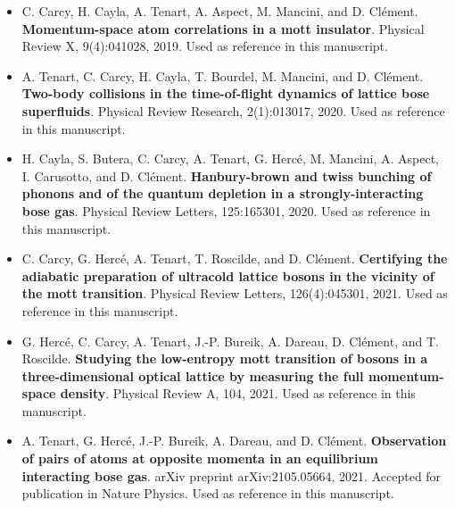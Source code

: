 \documentclass[a4paper, 11pt,twoside,openright]{book}
\begin{document}
\begin{itemize}
    \item C. Carcy, H. Cayla, A. Tenart, A. Aspect, M. Mancini, and D. Clément. \textbf{Momentum-space atom correlations in a mott insulator}. Physical Review X, 9(4):041028, 2019. Used as reference \cite{carcy2019momentum} in this manuscript.
    \vspace{0.5cm}
    \item A. Tenart, C. Carcy, H. Cayla, T. Bourdel, M. Mancini, and D. Clément. \textbf{Two-body collisions in the time-of-flight dynamics of lattice bose superfluids}. Physical Review Research, 2(1):013017, 2020. Used as reference \cite{tenart2020two} in this manuscript.
    \vspace{0.5cm}
    \item H. Cayla, S. Butera, C. Carcy, A. Tenart, G. Hercé, M. Mancini, A. Aspect, I. Carusotto, and D. Clément. \textbf{ Hanbury-brown and twiss bunching of phonons and of the quantum depletion in a strongly-interacting bose gas}. Physical Review Letters, 125:165301, 2020. Used as reference \cite{cayla2020} in this manuscript.
    \vspace{0.5cm}
    \item C. Carcy, G. Hercé, A. Tenart, T. Roscilde, and D. Clément. \textbf{Certifying the adiabatic preparation of ultracold lattice bosons in the vicinity of the mott transition}. Physical Review Letters, 126(4):045301, 2021. Used as reference \cite{carcy2021} in this manuscript.
    \vspace{0.5cm}
    \item G. Hercé, C. Carcy, A. Tenart, J.-P. Bureik, A. Dareau, D. Clément, and T. Roscilde. \textbf{Studying the low-entropy mott transition of bosons in a three-dimensional optical lattice by measuring the full momentum-space density}. Physical Review A, 104, 2021. Used as reference \cite{herce2021studying} in this manuscript.
    \vspace{0.5cm}
    \item A. Tenart, G. Hercé, J.-P. Bureik, A. Dareau, and D. Clément. \textbf{Observation of pairs of atoms at opposite momenta in an equilibrium interacting bose gas}. arXiv preprint arXiv:2105.05664, 2021. Accepted for publication in Nature Physics. Used as reference \cite{tenart2021observation} in this manuscript. 
\end{itemize}




\setlength{\parskip}{\parskipinitial}





\end{document}
